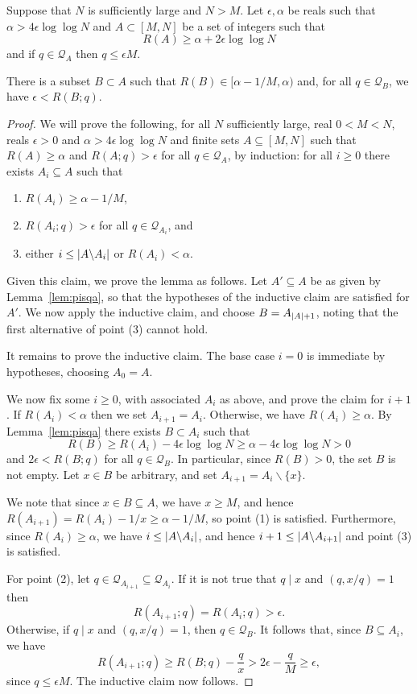 \begin{lemma}\label{lem:pisq}
  \leanok
Suppose that $N$ is sufficiently large and $N>M$. Let $\epsilon,\alpha$ be reals such that $\alpha > 4\epsilon\log\log N$ and $A\subset [M,N]$ be a set of integers such that
\[R(A) \geq \alpha+2\epsilon\log\log N\]
and if $q\in\mathcal{Q}_A$ then $q\leq \epsilon M$.

There is a subset $B\subset A$ such that $R(B)\in [\alpha-1/M,\alpha)$ and, for all $q\in \mathcal{Q}_B$, we have $\epsilon < R(B;q)$.
\end{lemma}
\begin{proof}
\leanok
We will prove the following, for all $N$ sufficiently large, real $0<M<N$, reals $\epsilon>0$ and $\alpha > 4\epsilon\log\log N$ and finite sets $A\subseteq [M,N]$ such that $R(A)\geq \alpha$ and $R(A;q)> \epsilon$ for all $q\in\mathcal{Q}_A$, by induction: for all $i\geq 0$ there exists $A_i\subseteq A$ such that
\begin{enumerate}
\item $R(A_i)\geq \alpha-1/M$,
\item $R(A_i;q) > \epsilon$ for all $q\in\mathcal{Q}_{A_i}$, and
\item either $i\leq \left\lvert A\backslash A_i\right\rvert$ or $R(A_i)<\alpha$.
\end{enumerate}

Given this claim, we prove the lemma as follows. Let $A'\subseteq A$ be as given by Lemma~\ref{lem:pisqa}, so that the hypotheses of the inductive claim are satisfied for $A'$. We now apply the inductive claim, and choose $B=A_{\left\lvert A\right\rvert+1}$, noting that the first alternative of point (3) cannot hold.

It remains to prove the inductive claim. The base case $i=0$ is immediate by hypotheses, choosing $A_0=A$.

We now fix some $i\geq 0$, with associated $A_i$ as above, and prove the claim for $i+1$. If $R(A_i)<\alpha$ then we set $A_{i+1}=A_i$. Otherwise, we have $R(A_i)\geq \alpha$. By Lemma~\ref{lem:pisqa} there exists $B\subset A_i$ such that
\[R(B)\geq  R(A_i)-4\epsilon\log\log N\geq \alpha - 4\epsilon\log\log N>0\]
and $2\epsilon < R(B;q)$ for all $q\in \mathcal{Q}_B$. In particular, since $R(B)>0$, the set $B$ is not empty. Let $x\in B$ be arbitrary, and set $A_{i+1}=A_i\backslash \{x\}$.

We note that since $x\in B\subseteq A$, we have $x\geq M$, and hence $R(A_{i+1})=R(A_i)-1/x\geq \alpha-1/M$, so point (1) is satisfied. Furthermore, since $R(A_i)\geq \alpha$, we have $i\leq \left\lvert A\backslash A_i\right\rvert$, and hence $i+1 \leq \left\lvert A\backslash A_{i+1}\right\rvert$ and point (3) is satisfied.

For point (2), let $q\in \mathcal{Q}_{A_{i+1}}\subseteq \mathcal{Q}_{A_i}$. If it is not true that $q\mid x$ and $(q,x/q)=1$ then
\[R(A_{i+1};q) = R(A_i; q)>\epsilon.\]
Otherwise, if $q\mid x$ and $(q,x/q)=1$, then $q\in\mathcal{Q}_B$. It follows that, since $B\subseteq A_i$, we have
\[R(A_{i+1};q)\geq R(B;q)-\frac{q}{x}>2\epsilon -\frac{q}{M}\geq \epsilon,\]
since $q\leq \epsilon M$. The inductive claim now follows.
\end{proof}


